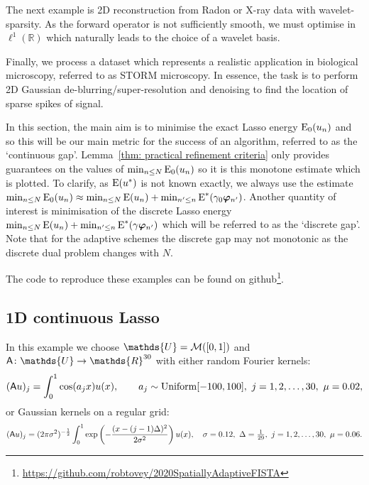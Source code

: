 \documentclass[smallextended]{svjour3}
\let\F\mathds\let\C\mathcal\newcommand{\R}{\F{R}}\newcommand{\A}{\tens{A}}
\newcommand{\op}[1]{\operatorname{#1}}
\newcommand{\1}{\F{1}}
\newcommand*{\varf}[1]{%
	\IfEqCase{#1}{%
		{0}{u}%
		{1}{v}%
		{2}{w}%
	}[u#1]%
}
\newcommand*{\spcf}[1]{%
	\IfEqCase{#1}{%
		{0}{\F{U}}%
		{1}{\F{V}}%
		{2}{\F{W}}%
	}[\F{U}#1]%
}
\newcommand*{\vard}[1]{%
	\IfEqCase{#1}{%
		{0}{\varphi}%
		{1}{\psi}%
	}[\varphi #1]%
}
\newcommand*{\varx}[1]{%
	\IfEqCase{#1}{%
		{0}{x}%
		{1}{y}%
		{2}{z}%
		{3}{r}%
	}[x#1]%
}
\newcommand*{\vars}[1]{%
	\IfEqCase{#1}{%
		{0}{\alpha}%
		{1}{\beta}%
		{2}{\gamma}%
		{3}{a}%
		{4}{b}%
		{5}{c}%
	}[k#1]%
}
\newcommand*{\vvard}[1]{\vec{\vard{#1}}}
\begin{document}
	The next example is 2D reconstruction from Radon or X-ray data with wavelet-sparsity. As the forward operator is not sufficiently smooth, we must optimise in $\ell^1(\R)$ which naturally leads to the choice of a wavelet basis. 
	
	Finally, we process a dataset which represents a realistic application in biological microscopy, referred to as STORM microscopy. In essence, the task is to perform 2D Gaussian de-blurring/super-resolution and denoising to find the location of sparse spikes of signal.
	
	In this section, the main aim is to minimise the exact Lasso energy $\op{E}_0(\varf0_n)$ and so this will be our main metric for the success of an algorithm, referred to as the `continuous gap'. Lemma~\ref{thm: practical refinement criteria} only provides guarantees on the values of $\min_{n\leq N}\op{E}_0(\varf0_n)$ so it is this monotone estimate which is plotted. To clarify, as $\op{E}(\varf0^*)$ is not known exactly, we always use the estimate $\min_{n\leq N}\op{E}_0(\varf0_n) \approx \min_{n\leq N}\op{E}(\varf0_n) + \min_{n'\leq n}\op{E}^*(\vars2_0\vvard0_{n'})$. Another quantity of interest is minimisation of the discrete Lasso energy $\min_{n\leq N}\op{E}(\varf0_n) + \min_{n'\leq n}\op{E}^*(\vars2\vvard0_{n'})$ which will be referred to as the `discrete gap'. Note that for the adaptive schemes the discrete gap may not monotonic as the discrete dual problem changes with $N$.
	
	The code to reproduce these examples can be found on github\footnote{\href{https://github.com/robtovey/2020SpatiallyAdaptiveFISTA}{https://github.com/robtovey/2020SpatiallyAdaptiveFISTA}}.
	
	
	\subsection{1D continuous Lasso}\label{sec: 1D Lasso examples}
	In this example we choose $\spcf0=\C M([0,1])$ and $\A\colon \spcf0\to \R^{30}$ with either random Fourier kernels:
	\begin{equation}
		(\A\varf0)_j = \int_0^1\cos(\vars3_j\varx0)\varf0(\varx0), \qquad \vars3_j\sim \op{Uniform}[-100,100],\ j=1,2,\ldots,30,\ \mu =0.02, 
	\end{equation}
	or Gaussian kernels on a regular grid:
	\begin{equation}
		(\A\varf0)_j = (2\pi\sigma^2)^{-\frac12}\int_0^1\exp\left(-\frac{(\varx0-(j-1)\Delta)^2}{2\sigma^2}\right)\varf0(\varx0), \quad \sigma=0.12,\ \Delta = \tfrac1{29},\ j=1,2,\ldots,30,\ \mu=0.06.
	\end{equation}
	
\end{document}
